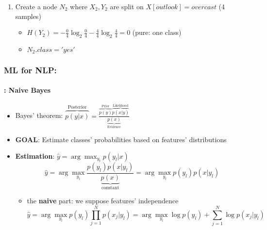 \documentclass[xcolor=table]{beamer}
\begin{document}
\begin{frame}
\begin{enumerate}
			\item Create a node $ N_2 $ where $ X_2, Y_2 $ are split on $ X[outlook] = overcast$ (4 samples)
			\begin{itemize}\tiny\bfseries
				\item $ H(Y_2) = - \frac{0}{4} \log_2 \frac{0}{4} - \frac{4}{4} \log_2 \frac{4}{4} = 0$ (pure: one class)
				\item $ N_2.class = 'yes' $
			\end{itemize}
		
		\end{enumerate}
	\end{frame}

	\begin{frame}
		\frametitle{ML for NLP: \insertsection}
		\framesubtitle{\insertsubsection: Naive Bayes}
		
		\begin{itemize}
			\item Bayes' theorem: $ \overbrace{p(y|x)}^\text{Posterior} = \frac{\overbrace{p(y)}^\text{Prior} \overbrace{p(x|y)}^{\text{Likelihood}}}{\underbrace{p(x)}_\text{Evidence}}$
			\item \textbf{GOAL}: Estimate classes' probabilities based on features' distributions
			\item \textbf{Estimation}: $ \hat{y} = \arg\max_{y_l} p(y_l|x)$
			\[\hat{y} = \arg\max_{y_l} \frac{p(y_l) p(x|y_l)}{\underbrace{p(x)}_\text{constant}} = \arg\max_{y_l} p(y_l) p(x|y_l)\]
			\begin{itemize}
				\item the \textbf{naive} part: we suppose features' independence
				\[\hat{y} = \arg\max_{y_l} p(y_l) \prod_{j=1}^{N} p(x_j|y_l) = \arg\max_{y_l} \log p(y_l) + \sum_{j=1}^{N} \log p(x_j|y_l)\]
			\end{itemize}
		\end{itemize}
		
	\end{frame}
\end{document}
